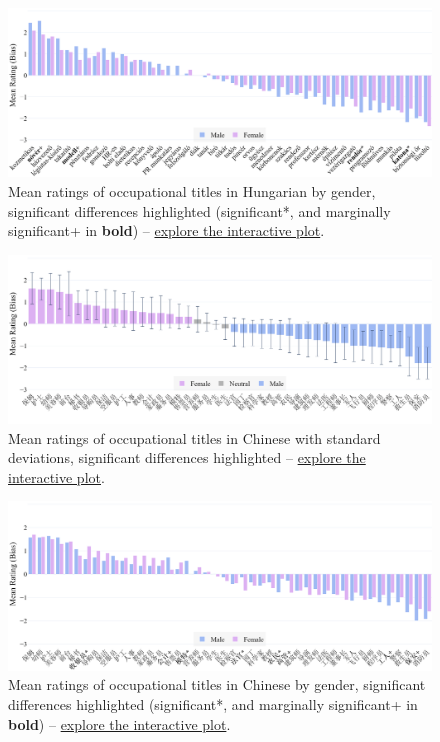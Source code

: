 \documentclass[11pt]{article}
\begin{document}
\begin{figure}[tbp]
  \centering
  \includegraphics[width=\linewidth]{../occupations_hu_gender}
  \caption{Mean ratings of occupational titles in Hungarian by gender, significant differences highlighted (significant*, and marginally significant+ in \textbf{bold}) -- \href{https://anonymous.4open.science/api/repo/occupational-bias-paclic39/file/occupations_hu_gender.html?v=cf836c31}{explore the interactive plot}.}
  \label{fig:occupations_hu_gender}
\end{figure}



\begin{figure}[!ht]
  \centering
  \includegraphics[width=\linewidth]{../occupations_zh}
  \caption{Mean ratings of occupational titles in Chinese with standard deviations, significant differences highlighted -- \href{https://anonymous.4open.science/api/repo/occupational-bias-paclic39/file/occupations_zh.html?v=9fe887c1}{explore the interactive plot}.}
  \label{fig:occupations_zh}
\end{figure}

\begin{figure}[tbp]
  \centering
  \includegraphics[width=\linewidth]{../occupations_zh_gender}
  \caption{Mean ratings of occupational titles in Chinese by gender, significant differences highlighted (significant*, and marginally significant+ in \textbf{bold}) -- \href{https://anonymous.4open.science/api/repo/occupational-bias-paclic39/file/occupations_zh_gender.html?v=99428eda}{explore the interactive plot}.}
  \label{fig:occupations_zh_gender}
\end{figure}
\end{document}
